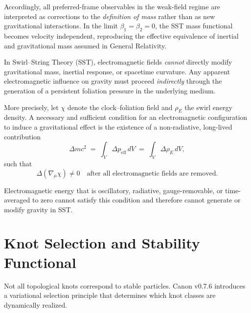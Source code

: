 \documentclass[10pt]{article}
\begin{document}
    Accordingly, all preferred-frame observables in the weak-field regime are
    interpreted as corrections to the \emph{definition of mass} rather than as
    new gravitational interactions. In the limit $\beta_1=\beta_2=0$, the SST
    mass functional becomes velocity independent, reproducing the effective
    equivalence of inertial and gravitational mass assumed in General Relativity.

    \begin{theorem}
    \label{thm:canon_EM_no_gravity}

    In Swirl--String Theory (SST), electromagnetic fields \emph{cannot} directly
    modify gravitational mass, inertial response, or spacetime curvature.
    Any apparent electromagnetic influence on gravity must proceed
    \emph{indirectly} through the generation of a persistent foliation pressure
    in the underlying medium.

    More precisely, let $\chi$ denote the clock--foliation field and
    $\rho_{\!E}$ the swirl energy density.
    A necessary and sufficient condition for an electromagnetic configuration
    to induce a gravitational effect is the existence of a non-radiative,
    long-lived contribution
    \begin{equation}
        \Delta m c^2
        \;=\;
        \int_V \Delta p_{\mathrm{eff}} \, dV
        \;=\;
        \int_V \Delta \rho_{\!E} \, dV ,
    \end{equation}
    such that
    \begin{equation}
        \Delta(\nabla_\mu \chi) \neq 0
        \quad\text{after all electromagnetic fields are removed.}
    \end{equation}

    Electromagnetic energy that is oscillatory, radiative, gauge-removable,
    or time-averaged to zero cannot satisfy this condition and therefore cannot
    generate or modify gravity in SST.
    \end{theorem}

    \section{Knot Selection and Stability Functional}
    \label{sec:knotSelection}

Not all topological knots correspond to stable particles.
Canon v0.7.6 introduces a variational selection principle that determines
which knot classes are dynamically realized.
\end{document}

